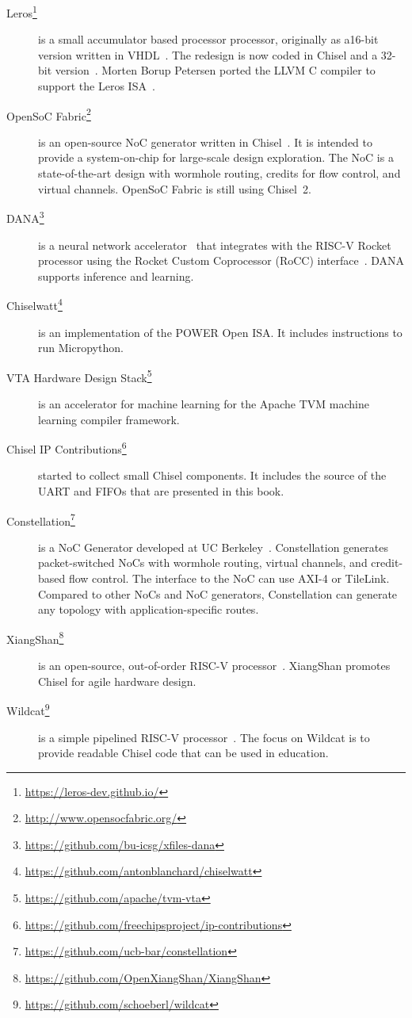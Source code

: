 \documentclass[%
    10pt,
    headinclude, footinclude=false,
    openright, %
    notitlepage,
    cleardoublepage=empty,
    headsepline,
    numbers=noenddot,
    bibliography=totoc, index=totoc,
    ]{scrbook}
\newcommand{\myref}[2]{\href{#1}{#2}}
\renewcommand{\myref}[2]{{#2}{\footnote{\url{#1}}}}
\begin{document}
\begin{description}
\item[\myref{https://leros-dev.github.io/}{Leros}] is a small accumulator based processor
processor, originally as a16-bit version written in VHDL~\cite{leros:fpl2011}.
The redesign is now coded in Chisel and a 32-bit version~\cite{leros:arcs2019}.
Morten Borup Petersen ported the LLVM C compiler to support the Leros ISA~\cite{leros:comp:2019}.


\item[\myref{http://www.opensocfabric.org/}{OpenSoC Fabric}] is an open-source NoC
generator written in Chisel~\cite{OpenSoC:ispass2016}. It is intended to provide a
system-on-chip for large-scale design exploration.
The NoC is a state-of-the-art design with wormhole routing, credits for flow control, and virtual channels.
OpenSoC Fabric is still using Chisel~2.

\item[\myref{https://github.com/bu-icsg/xfiles-dana}{DANA}] is a neural network accelerator~\cite{eldridge2015}
that integrates with the RISC-V Rocket processor using the Rocket Custom Coprocessor (RoCC) interface~\cite{RoCC:2015}.
DANA supports inference and learning.

\item[\myref{https://github.com/antonblanchard/chiselwatt}{Chiselwatt}] is an implementation
of the POWER Open ISA. It includes instructions to run Micropython.

\item[\myref{https://github.com/apache/tvm-vta}{VTA Hardware Design Stack}] is an accelerator for
machine learning for the Apache TVM machine learning compiler framework.

\item[\myref{https://github.com/freechipsproject/ip-contributions}{Chisel IP Contributions}]
started to collect small Chisel components. It includes the source of the
UART and FIFOs that are presented in this book.

\item[\myref{https://github.com/ucb-bar/constellation}{Constellation}] is a NoC Generator
developed at UC Berkeley~\cite{Constellation:2022}.
Constellation generates packet-switched NoCs with wormhole routing,
virtual channels, and credit-based flow control. The interface to the NoC
can use AXI-4 or TileLink. Compared to other NoCs and NoC generators,
Constellation can generate any topology with application-specific routes.

\item[\myref{https://github.com/OpenXiangShan/XiangShan}{XiangShan}] is an open-source,
out-of-order RISC-V processor~\cite{micro2022xiangshan}.
XiangShan promotes Chisel for agile hardware design.

\item[\myref{https://github.com/schoeberl/wildcat}{Wildcat}]  is a simple pipelined
RISC-V processor~\cite{wildcat:2024}. The focus on Wildcat is to provide readable
Chisel code that can be used in education.

\end{description}
\end{document}
